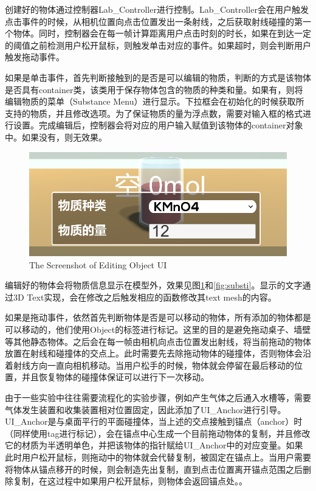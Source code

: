 	创建好的物体通过控制器Lab\_Controller进行控制。Lab\_Controller会在用户触发点击事件的时候，从相机位置向点击位置发出一条射线，之后获取射线碰撞的第一个物体。同时，控制器会在每一帧计算距离用户点击时刻的时长，如果在到达一定的阈值之前检测用户松开鼠标，则触发单击对应的事件。如果超时，则会判断用户触发拖动事件。

	如果是单击事件，首先判断接触到的是否是可以编辑的物质，判断的方式是该物体是否具有container类，该类用于保存物体包含的物质的种类和量。如果有，则将编辑物质的菜单（Substance Menu）进行显示。下拉框会在初始化的时候获取所支持的物质，并且修改选项。为了保证物质的量为浮点数，需要对输入框的格式进行设置。完成编辑后，控制器会将对应的用户输入赋值到该物体的container对象中。如果没有，则无效果。
	
\begin{figure}[!htp]
  \centering
  \includegraphics[width=12cm]{figure/subs.png}
    {The Screenshot of Editing Object UI}
 \label{fig:subs}
\end{figure}

编辑好的物体会将物质信息显示在模型外，效果见图\ref{fig:subs}和\ref{fig:substi}。显示的文字通过3D Text实现，会在修改之后触发相应的函数修改其text mesh的内容。

如果是拖动事件，依然首先判断物体是否是可以移动的物体，所有添加的物体都是可以移动的，他们使用Object的标签进行标记。这里的目的是避免拖动桌子、墙壁等其他静态物体。之后会在每一帧由相机向点击位置发出射线，将当前拖动的物体放置在射线和碰撞体的交点上。此时需要先去除拖动物体的碰撞体，否则物体会沿着射线方向一直向相机移动。当用户松手的时候，物体就会停留在最后移动的位置，并且恢复物体的碰撞体保证可以进行下一次移动。

由于一些实验中往往需要流程化的实验步骤，例如产生气体之后通入水槽等，需要气体发生装置和收集装置相对位置固定，因此添加了UI\_Anchor进行引导。UI\_Anchor是与桌面平行的平面碰撞体，当上述的交点接触到锚点（anchor）时（同样使用tag进行标记），会在锚点中心生成一个目前拖动物体的复制，并且修改它的材质为半透明单色，并把该物体的指针赋给UI\_Anchor中的对应变量。如果此时用户松开鼠标，则拖动中的物体就会代替复制，被固定在锚点上。当用户需要将物体从锚点移开的时候，则会制造先出复制，直到点击位置离开锚点范围之后删除复制，在这过程中如果用户松开鼠标，则物体会返回锚点处。。
	
